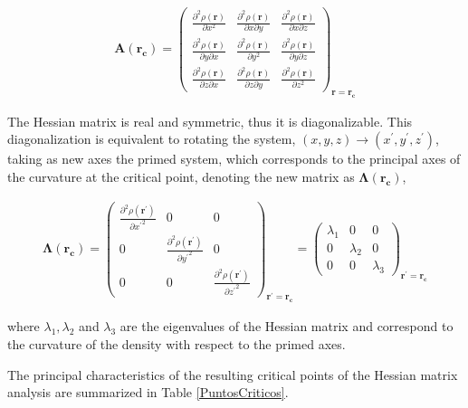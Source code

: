 \begin{align}
\mathbf{A(r_{c})} =
\begin{pmatrix} \frac{\partial^2\rho(\mathbf{r})}{\partial x^2} & \frac{\partial^2\rho(\mathbf{r})}{\partial x\partial y} & \frac{\partial^2\rho(\mathbf{r})}{\partial x\partial z} 
\\ \frac{\partial^2\rho(\mathbf{r})}{\partial y\partial x} & \frac{\partial^2\rho(\mathbf{r})}{\partial y^2} & \frac{\partial^2\rho(\mathbf{r})}{\partial y\partial z}
\\ \frac{\partial^2\rho(\mathbf{r})}{\partial z\partial x} & \frac{\partial^2\rho(\mathbf{r})}{\partial z\partial y} & \frac{\partial^2\rho(\mathbf{r})}{\partial z^2}
 \end{pmatrix}_{\mathbf{r=r_{c}}} 
\end{align}

The Hessian matrix is real and symmetric, thus it is diagonalizable. This
diagonalization is equivalent to rotating the system, $(x, y, z) \rightarrow
(x^{\prime}, y^{\prime}, z^{\prime})$, taking as new axes the primed system,
which corresponds to the principal axes of the curvature at the critical
point, denoting the new matrix as $\mathbf{\Lambda(\mathbf{r}_c)}$,

\begin{align}
\mathbf{\Lambda(\mathbf{r}_c)}= \begin{pmatrix}
\frac{\partial^2\rho(\mathbf{r^{\prime}})}{\partial {x^{\prime}}^2} & 0 & 0
\\ 0 & \frac{\partial^2\rho(\mathbf{r^{\prime}})}{\partial {y^{\prime}}^2} & 0
\\ 0 & 0 & \frac{\partial^2\rho(\mathbf{r^{\prime}})}{\partial {z^{\prime}}^2}
\end{pmatrix}_{\mathbf{r^{\prime}=\mathbf{r}_{c}}} =
\begin{pmatrix}
\lambda_1 & 0 & 0
\\ 0 & \lambda_2 & 0
\\ 0 & 0 & \lambda_3
\end{pmatrix}_{\mathbf{r^{\prime}=\mathbf{r}_{c}}} 
\end{align}

\noindent where $\lambda_1, \lambda_2$ and $\lambda_3$ are the eigenvalues
of the Hessian matrix and correspond to the curvature of the density with
respect to the primed axes.

The principal characteristics of the resulting critical points of the Hessian matrix
analysis are summarized in Table \ref{PuntosCriticos}.

